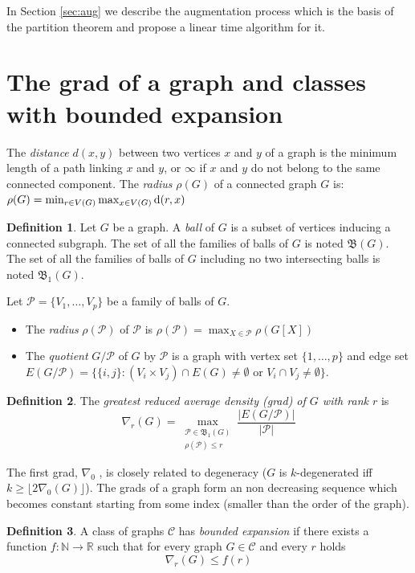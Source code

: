\documentclass[a4paper]{amsart}
\theoremstyle{definition}
\newtheorem{definition}{Definition}[section]
\theoremstyle{remark}
\newcommand{\field}[1]{\mathbb{#1}}
\newcommand{\bbbn}{\field{N}}
\newcommand{\bbbr}{\field{R}}
\newcommand{\rdens}[1]{\nabla_{#1}}
\begin{document}
In Section \ref{sec:aug} we describe the augmentation process
which is the basis of the partition theorem and propose
a linear time algorithm for it.

\section{The grad of a graph and classes with bounded expansion}
\label{sec:grad}
 The {\em
  distance} $d(x,y)$ between two vertices $x$ and $y$ of a graph is the minimum
length of a path linking $x$ and $y$, or $\infty$ if $x$ and $y$ do not
belong to the same connected component.
The {\em radius} $\rho(G)$ of a connected graph $G$ is:
$\rho(G)=\min_{r\in V(G)}\max_{x\in V(G)} {\rm d}(r,x)$

\begin{definition}
Let $G$ be a graph. A {\em ball} of $G$ is a subset of vertices
inducing a connected subgraph. 
The set of all the families of balls of $G$ is noted
$\mathfrak{B}(G)$.
The set of all the families of balls of $G$ including no two
intersecting balls is noted $\mathfrak{B}_1(G)$.

Let $\mathcal P=\{V_1,\dotsc,V_p\}$ be a family of balls of $G$.
\begin{itemize}
\item
 The {\em radius} $\rho(\mathcal P)$ of $\mathcal P$ is
 $\rho(\mathcal P)=\max_{X\in \mathcal P}\rho(G[X])$ 
\item
The {\em quotient} $G/\mathcal P$ of $G$ by 
  $\mathcal P$ is a graph with vertex set $\{1,\dotsc,p\}$ and edge
  set $E(G/\mathcal P)=\{\{i,j\}: (V_i\times V_j)\cap
  E(G)\neq\emptyset\text{ or }V_i\cap V_j\neq\emptyset\}$.
\end{itemize}
\end{definition}

\begin{definition} 
The {\em greatest reduced average density (grad) of $G$
      with rank $r$} is
$$\rdens{r}(G)=\max_{\substack{\mathcal P\in\mathfrak{B}_1(G)\\
\rho(\mathcal P)\leq r}}\frac{|E(G/\mathcal P)|}{|\mathcal P|}$$
\end{definition}

The first grad, $\rdens{0}$ , is closely related to
degeneracy ($G$ is $k$-degenerated iff $k\geq
\lfloor 2\rdens{0}(G)\rfloor$).  The grads of a graph form an
non decreasing sequence which becomes constant starting from some index (smaller than
the order of the graph).


\begin{definition}
A class of graphs $\mathcal C$ has {\em bounded expansion} if there
exists a function $f:\bbbn\rightarrow\bbbr$ such that for every graph $G \in \mathcal C$ and every $r$ holds
\begin{equation}
 \rdens{r}(G)\leq f(r)
\end{equation}
\end{definition}
\end{document}

